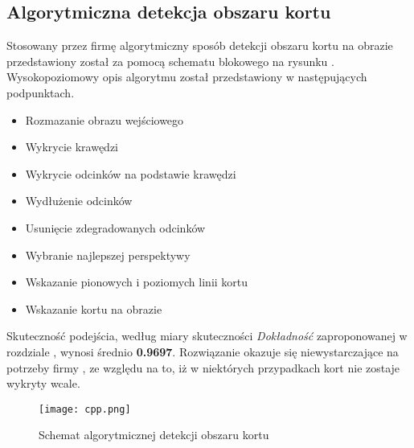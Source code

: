 \subsection{Algorytmiczna detekcja obszaru kortu}

Stosowany przez firmę \blue{} algorytmiczny sposób detekcji obszaru kortu na obrazie przedstawiony został za pomocą schematu blokowego na rysunku . Wysokopoziomowy opis algorytmu został przedstawiony w następujących podpunktach.

\begin{itemize}
  \item Rozmazanie obrazu wejściowego
  \item Wykrycie krawędzi
  \item Wykrycie odcinków na podstawie krawędzi
  \item Wydłużenie odcinków
  \item Usunięcie zdegradowanych odcinków
  \item Wybranie najlepszej perspektywy
  \item Wskazanie pionowych i poziomych linii kortu
  \item Wskazanie kortu na obrazie
\end{itemize}

Skuteczność podejścia, według miary skuteczności \textit{Dokładność} zaproponowanej w rozdziale , wynosi średnio \textbf{0.9697}.
Rozwiązanie okazuje się niewystarczające na potrzeby firmy \blue{}, ze względu na to, iż w niektórych przypadkach kort nie zostaje wykryty wcale.

\begin{figure}[h]
  \centering
  \caption{Schemat algorytmicznej detekcji obszaru kortu}
  \texttt{[image: cpp.png]}
  \label{fig:algcpp}
\end{figure}
